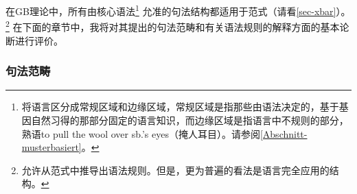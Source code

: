 在GB理论中，所有由核心语法\footnote{%
 \citet[--8]{Chomsky81a}将语言区分成常规区域和边缘区域，常规区域是指那些由语法决定的，基于基因自然习得的那部分固定的语言知识，而边缘区域是指语言中不规则的部分，\egc 熟语to pull the wool over sb.'s eyes（掩人耳目）。请参阅\ref{Abschnitt-musterbasiert}。
}
允准的句法结构都适用于\xbar 范式（请看\ref{sec-xbar}）。\footnote{%
 \citet[]{Chomsky70a} 允许从\xbarc 范式中推导出语法规则。但是，更为普遍的看法是语言完全应用\xbarc 的结构。
}
在下面的章节中，我将对其提出的句法范畴和有关语法规则的解释方面的基本论断进行评价。

\subsubsection{句法范畴}
\label{GB-syntaktische-categoryn}


